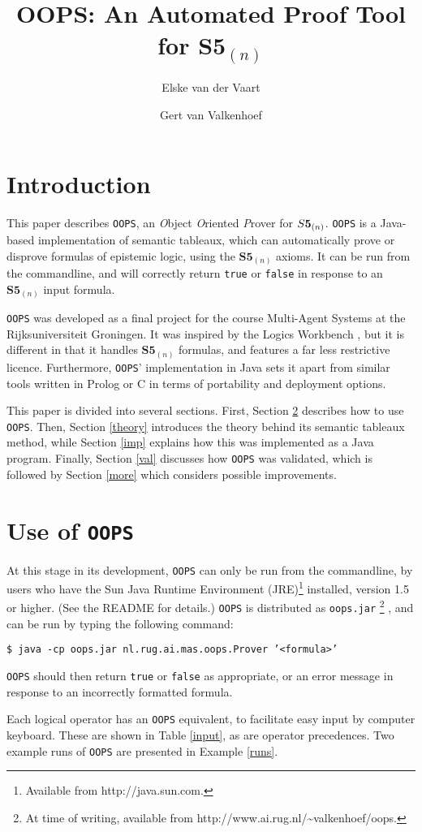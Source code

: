 \documentclass[11pt,a4paper]{article}
\author{Elske van der Vaart \and Gert van Valkenhoef}
\title{OOPS: An Automated Proof Tool for $\textbf{S5}_{(n)}$}
\begin{document}
\maketitle

\section{Introduction}

This paper describes {\tt OOPS}, an {\it O}bject {\it O}riented {\it P}rover for $\mathbf\mathit{S}\textbf{5}_{(n)}$. {\tt OOPS} is a Java-based implementation of semantic tableaux, which can automatically prove or disprove  formulas of epistemic logic, using the $\textbf{S5}_{(n)}$ axioms. It can be run from the commandline, and will correctly return {\tt true} or {\tt false} in response to an $\textbf{S5}_{(n)}$ input formula.
\par {\tt OOPS} was developed as a final project for the course Multi-Agent Systems at the Rijksuniversiteit Groningen. It was inspired by the Logics Workbench \cite{wb}, but it is different in that it handles $\textbf{S5}_{(n)}$ formulas, and features a far less restrictive licence.
Furthermore, {\tt OOPS}' implementation in Java sets it apart from similar tools written in Prolog or C in terms of portability and deployment options.
\par This paper is divided into several sections. First, Section \ref{use} describes how to use {\tt OOPS}. Then, Section \ref{theory} introduces the theory behind its semantic tableaux method, while Section \ref {imp} explains how this was implemented as a Java program. Finally, Section \ref{val} discusses how {\tt OOPS} was validated, which is followed by Section \ref{more} which considers possible improvements.

\section{Use of {\tt OOPS}}
\label{use}
At this stage in its development, {\tt OOPS} can only be run from the commandline, by users who have the Sun Java Runtime Environment (JRE)\footnote{Available from http://java.sun.com.} installed, version 1.5 or higher. (See the README for details.)  {\tt OOPS} is distributed as {\tt oops.jar} \footnote{At time of writing, available from http://www.ai.rug.nl/\~{}valkenhoef/oops.} , and can be run by typing the following command: \newline
\par {\tt \$ java -cp oops.jar nl.rug.ai.mas.oops.Prover '<formula>'} \newline
\par {\tt OOPS} should then return {\tt true} or {\tt false} as appropriate, or an error message in response to an incorrectly formatted formula.
\par Each logical operator has an {\tt OOPS} equivalent, to facilitate easy input by computer keyboard. These are shown in Table \ref{input}, as are operator precedences. Two example runs of {\tt OOPS} are presented in Example \ref{runs}.
\end{document}
